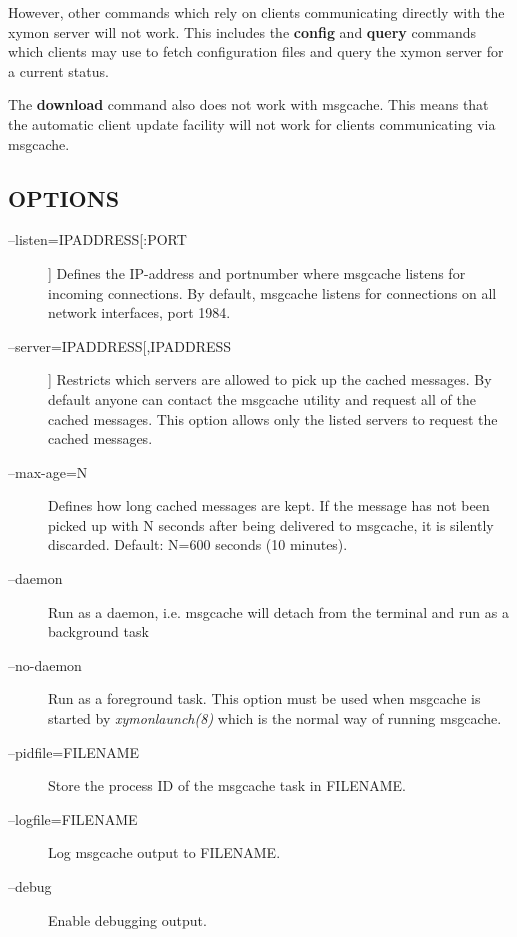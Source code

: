   However, other commands which rely on clients communicating directly with the xymon server will not work. This includes the \textbf{config}
 and \textbf{query}
 commands which clients may use to fetch configuration files and query the xymon server for a current status. 


  The \textbf{download}
 command also does not work with msgcache. This means that the automatic client update facility will not work for clients communicating via msgcache. 


 
\subsection{OPTIONS}
\begin{description}
\item[--listen=IPADDRESS[:PORT]] Defines the IP-address and portnumber where msgcache listens for incoming connections. By default, msgcache listens for connections on all network interfaces, port 1984. 

 

\item[--server=IPADDRESS[,IPADDRESS]] Restricts which servers are allowed to pick up the cached messages. By default anyone can contact the msgcache utility and request all of the cached messages. This option allows only the listed servers to request the cached messages. 

 

\item[--max-age=N] Defines how long cached messages are kept. If the message has not been picked up with N seconds after being delivered to msgcache, it is silently discarded. Default: N=600 seconds (10 minutes). 

 

\item[--daemon] Run as a daemon, i.e. msgcache will detach from the terminal and run as a background task 

 

\item[--no-daemon] Run as a foreground task. This option must be used when msgcache is started by \emph{xymonlaunch(8)}
 which is the normal way of running msgcache. 

 

\item[--pidfile=FILENAME] Store the process ID of the msgcache task in FILENAME. 

 

\item[--logfile=FILENAME] Log msgcache output to FILENAME. 

 

\item[--debug] Enable debugging output. 

 


\end{description}
